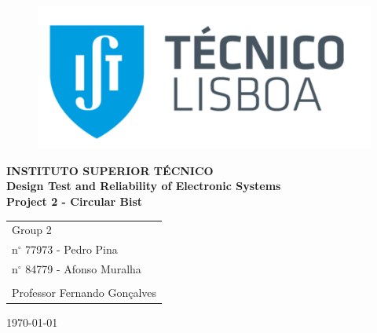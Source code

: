 \documentclass[12pt]{article}
\begin{document}
	
	
	
	\begin{titlepage}
		\begin{figure}
			\includegraphics[scale=0.4]{IST} 
		\end{figure}
		
		\vspace*{3cm}
		\begin{center}
			\headingfont\Large{\bfseries INSTITUTO SUPERIOR TÉCNICO}\\[2cm]
			\headingfont\LARGE{\bfseries Design Test and Reliability of Electronic Systems \\[1,5cm]Project 2 - Circular Bist}\\[0,5cm]
		\end{center}
		\vspace{3cm}
		\headingfont\hfill
		\begin{tabular}{@{}l@{}}
		    Group 2\\ 
			n$^{\circ}$ 77973 - Pedro Pina\\
			n$^{\circ}$ 84779 - Afonso Muralha\\
			\\
			Professor Fernando Gonçalves
			
		\end{tabular}
		\vspace{2,5cm}
		\begin{center}
			\today
		\end{center}
	\end{titlepage}
\end{document}
